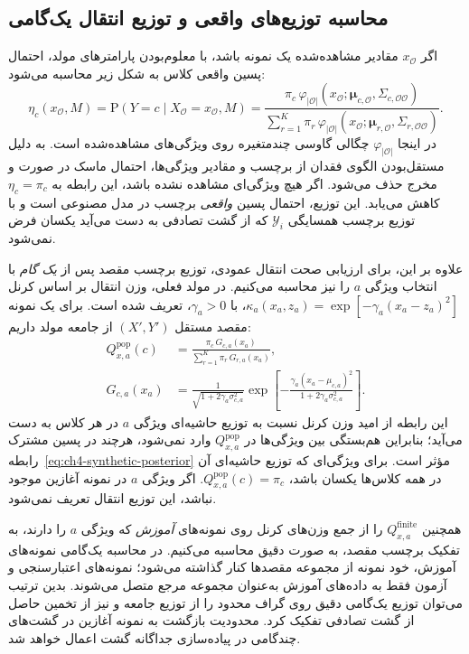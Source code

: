 \subsection{محاسبه توزیع‌های واقعی و توزیع انتقال یک‌گامی}
\label{subsec:ch4-synthetic-oracles}
اگر $x_{\mathcal O}$ مقادیر مشاهده‌شده یک نمونه باشد، با معلوم‌بودن پارامترهای مولد، احتمال پسین واقعی کلاس به شکل زیر محاسبه می‌شود:
\begin{equation}\label{eq:ch4-synthetic-posterior}
\boxed{
\eta_c(x_{\mathcal O},M)
=\mathrm P(Y=c\mid X_{\mathcal O}=x_{\mathcal O},M)
=\frac{\pi_c\,\varphi_{|\mathcal O|}(x_{\mathcal O};
\boldsymbol\mu_{c,\mathcal O},\Sigma_{c,\mathcal O\mathcal O})}
{\sum_{r=1}^{K}\pi_r\,\varphi_{|\mathcal O|}(x_{\mathcal O};
\boldsymbol\mu_{r,\mathcal O},\Sigma_{r,\mathcal O\mathcal O})}.
}
\end{equation}
در اینجا $\varphi_{|\mathcal O|}$ چگالی گاوسی چندمتغیره روی ویژگی‌های مشاهده‌شده است. به دلیل مستقل‌بودن الگوی فقدان از برچسب و مقادیر ویژگی‌ها، احتمال ماسک در صورت و مخرج حذف می‌شود. اگر هیچ ویژگی‌ای مشاهده نشده باشد، این رابطه به $\eta_c=\pi_c$ کاهش می‌یابد. این توزیع، احتمال پسین \emph{واقعی} برچسب در مدل مصنوعی است و با توزیع برچسب همسایگی $\mathscr Y_i$ که از گشت تصادفی به دست می‌آید یکسان فرض نمی‌شود.

علاوه بر این، برای ارزیابی صحت انتقال عمودی، توزیع برچسب مقصد پس از \emph{یک گام} با انتخاب ویژگی $a$ را نیز محاسبه می‌کنیم. در مولد فعلی، وزن انتقال بر اساس کرنل
$\kappa_a(x_a,z_a)=\exp[-\gamma_a(x_a-z_a)^2]$، با $\gamma_a>0$، تعریف شده است. برای یک نمونه مقصد مستقل $(X',Y')$ از جامعه مولد داریم:
\begin{equation}\label{eq:ch4-synthetic-pop-q}
\begin{aligned}
Q_{x,a}^{\mathrm{pop}}(c)
&=\frac{\pi_c\,G_{c,a}(x_a)}
{\sum_{r=1}^{K}\pi_r\,G_{r,a}(x_a)},\\
G_{c,a}(x_a)
&=\frac{1}{\sqrt{1+2\gamma_a\sigma_{c,a}^{2}}}
\exp\left[
-\frac{\gamma_a(x_a-\mu_{c,a})^2}
{1+2\gamma_a\sigma_{c,a}^{2}}
\right].
\end{aligned}
\end{equation}
این رابطه از امید وزن کرنل نسبت به توزیع حاشیه‌ای ویژگی $a$ در هر کلاس به دست می‌آید؛ بنابراین هم‌بستگی بین ویژگی‌ها در $Q_{x,a}^{\mathrm{pop}}$ وارد نمی‌شود، هرچند در پسین مشترک رابطه~\eqref{eq:ch4-synthetic-posterior} مؤثر است. برای ویژگی‌ای که توزیع حاشیه‌ای آن در همه کلاس‌ها یکسان باشد، $Q_{x,a}^{\mathrm{pop}}(c)=\pi_c$. اگر ویژگی $a$ در نمونه آغازین موجود نباشد، این توزیع انتقال تعریف نمی‌شود.

همچنین $Q_{x,a}^{\mathrm{finite}}$ را از جمع وزن‌های کرنل روی نمونه‌های \emph{آموزش} که ویژگی $a$ را دارند، به تفکیک برچسب مقصد، به صورت دقیق محاسبه می‌کنیم. در محاسبه یک‌گامی نمونه‌های آموزش، خود نمونه از مجموعه مقصدها کنار گذاشته می‌شود؛ نمونه‌های اعتبارسنجی و آزمون فقط به داده‌های آموزش به‌عنوان مجموعه مرجع متصل می‌شوند. بدین ترتیب می‌توان توزیع یک‌گامی دقیق روی گراف محدود را از توزیع جامعه و نیز از تخمین حاصل از گشت تصادفی تفکیک کرد. محدودیت بازگشت به نمونه آغازین در گشت‌های چندگامی در پیاده‌سازی جداگانه گشت اعمال خواهد شد.


